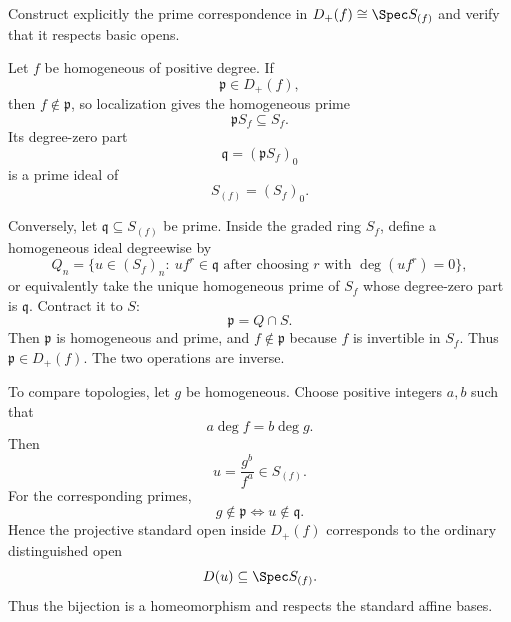\begin{problem}\label{prob:vi35-02}
Construct explicitly the prime correspondence in \(D_+(f)\cong\Spec S_{(f)}\) and verify that it respects basic opens.
\end{problem}

\ifdefined\FullProblemDossiers
\begin{solution}
Let \(f\) be homogeneous of positive degree. If
\[
\mathfrak p\in D_+(f),
\]
then \(f\notin\mathfrak p\), so localization gives the homogeneous prime
\[
\mathfrak pS_f\subseteq S_f.
\]
Its degree-zero part
\[
\mathfrak q=(\mathfrak pS_f)_0
\]
is a prime ideal of
\[
S_{(f)}=(S_f)_0.
\]

Conversely, let \(\mathfrak q\subseteq S_{(f)}\) be prime. Inside the graded ring \(S_f\), define a homogeneous
ideal degreewise by
\[
Q_n=\{u\in(S_f)_n:\ u f^r\in \mathfrak q
\text{ after choosing }r\text{ with }\deg(uf^r)=0\},
\]
or equivalently take the unique homogeneous prime of \(S_f\) whose degree-zero part is \(\mathfrak q\). Contract it
to \(S\):
\[
\mathfrak p=Q\cap S.
\]
Then \(\mathfrak p\) is homogeneous and prime, and \(f\notin\mathfrak p\) because \(f\) is invertible in \(S_f\).
Thus \(\mathfrak p\in D_+(f)\). The two operations are inverse.

To compare topologies, let \(g\) be homogeneous. Choose positive integers \(a,b\) such that
\[
a\deg f=b\deg g.
\]
Then
\[
u=\frac{g^b}{f^a}\in S_{(f)}.
\]
For the corresponding primes,
\[
g\notin\mathfrak p
\iff
u\notin\mathfrak q.
\]
Hence the projective standard open inside \(D_+(f)\) corresponds to the ordinary distinguished open
\[
D(u)\subseteq\Spec S_{(f)}.
\]
Thus the bijection is a homeomorphism and respects the standard affine bases.
\end{solution}
\fi
